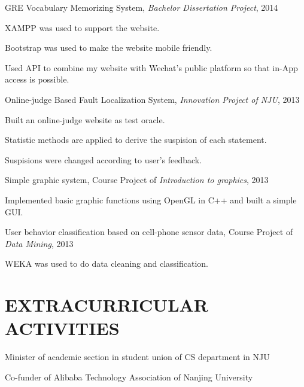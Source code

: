 \documentclass{res}
\newcommand{\parsp}{\vspace{-0.5\baselineskip}}
\newcommand{\additemindent}{\addtolength{\itemindent}{1em}}
\begin{document}
\begin{resume}
\begin{asparaenum}
	\item GRE Vocabulary Memorizing System, \emph{Bachelor Dissertation Project}, 2014
		\begin{asparaitem}
			\additemindent
			\item XAMPP was used to support the website.
			\item Bootstrap was used to make the website mobile friendly.
			\item Used API to combine my website with Wechat's public platform so that in-App access is possible.
		\end{asparaitem}

	\item Online-judge Based Fault Localization System, \emph{Innovation Project of NJU}, 2013
		\begin{asparaitem}
			\additemindent
			\item Built an online-judge website as test oracle. 
			\item Statistic methods are applied to derive the suspision of each statement. 
			\item Suspisions were changed according to user's feedback. 
		\end{asparaitem}

	\item Simple graphic system, Course Project of \emph{Introduction to graphics}, 2013
		\begin{asparaitem}
			\additemindent
			\item Implemented basic graphic functions using OpenGL in C++ and built a simple GUI. 
		\end{asparaitem}

	
 	\item User behavior classification based on cell-phone sensor data, Course Project of \emph{Data Mining}, 2013
 		\begin{asparaitem}
			\additemindent
			\item WEKA was used to do data cleaning and classification. 
		\end{asparaitem}

\end{asparaenum}

\parsp
\section{EXTRACURRICULAR ACTIVITIES}
\begin{asparaitem}
\item Minister of academic section in student union of CS department in NJU
\item Co-funder of Alibaba Technology Association of Nanjing University
\end{asparaitem}

\end{resume}
\end{document}
